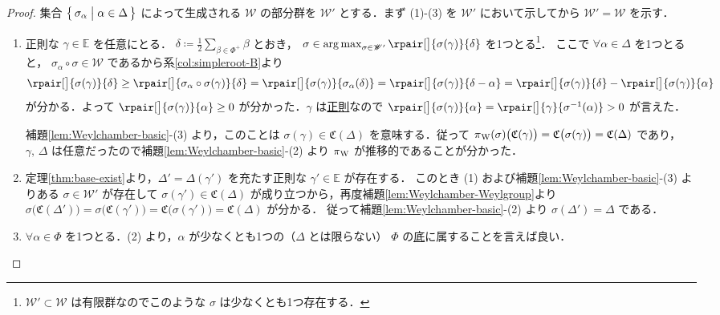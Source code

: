 \documentclass[rep_main]{subfiles}
\begin{document}
\begin{proof}
	集合 $\bigl\{\, \sigma_\alpha \bigm| \alpha \in \Delta \,\bigr\}$ によって生成される $\mathscr{W}$ の部分群を $\mathscr{W}'$ とする．まず (1)-(3) を $\mathscr{W}'$ において示してから $\mathscr{W}' = \mathscr{W}$ を示す．
	\begin{enumerate}
		\item 正則な $\gamma \in \mathbb{E}$ を任意にとる．
		$\delta \coloneqq \frac{1}{2} \sum_{\beta \in \Phi^+} \beta$ とおき，
		$\sigma \in \argmax_{\sigma \in \mathscr{W}'} \rpair[\big]{\sigma(\gamma)}{\delta}$
		を1つとる\footnote{$\mathscr{W}' \subset \mathscr{W}$ は有限群なのでこのような $\sigma$ は少なくとも1つ存在する．}．
		ここで $\forall \alpha \in \Delta$ を1つとると， 
		$\sigma_\alpha \circ \sigma \in \mathscr{W}$ であるから系\ref{col:simpleroot-B}より
		\begin{align}
			\rpair[\big]{\sigma(\gamma)}{\delta} \ge \rpair[\big]{\sigma_\alpha\circ \sigma(\gamma)}{\delta} = \rpair[\big]{\sigma(\gamma)}{\sigma_\alpha(\delta)} = \rpair[\big]{\sigma(\gamma)}{\delta - \alpha} = \rpair[\big]{\sigma(\gamma)}{\delta} - \rpair[\big]{\sigma(\gamma)}{\alpha}
		\end{align}
		が分かる．よって $\rpair[\big]{\sigma(\gamma)}{\alpha} \ge 0$ が分かった．$\gamma$ は\hyperref[def:decomposable]{正則}なので $\rpair[\big]{\sigma(\gamma)}{\alpha} = \rpair[\big]{\gamma}{\sigma^{-1}(\alpha)} > 0$ が言えた．
		
		補題\ref{lem:Weylchamber-basic}-(3) より，このことは $\sigma(\gamma) \in \mathfrak{C}(\Delta)$ を意味する．従って $\pi{}_{\mathrm{W}}(\sigma) \bigl( \mathfrak{C}(\gamma) \bigr) = \mathfrak{C}\bigl(\sigma(\gamma)\bigr) = \mathfrak{C}(\Delta)$ であり，$\gamma,\, \Delta$ は任意だったので補題\ref{lem:Weylchamber-basic}-(2) より $\pi{}_{\mathrm{W}}$ が推移的であることが分かった．

		\item 定理\ref{thm:base-exist}より，$\Delta' = \Delta(\gamma')$ を充たす正則な $\gamma' \in \mathbb{E}$ が存在する．
		このとき (1) および補題\ref{lem:Weylchamber-basic}-(3) よりある $\sigma \in \mathscr{W}'$ が存在して $\sigma (\gamma') \in \mathfrak{C}(\Delta)$ が成り立つから，再度補題\ref{lem:Weylchamber-Weylgroup}より $\sigma \bigl( \mathfrak{C}(\Delta') \bigr) = \sigma \bigl(\mathfrak{C}(\gamma')\bigr) = \mathfrak{C} \bigl( \sigma(\gamma') \bigr) = \mathfrak{C}(\Delta)$ が分かる．
		従って補題\ref{lem:Weylchamber-basic}-(2) より $\sigma(\Delta') = \Delta$ である．
		\item $\forall \alpha \in \Phi$ を1つとる．(2) より，$\alpha$ が少なくとも1つの（$\Delta$ とは限らない） $\Phi$ の\hyperref[def:base-root]{底}に属することを言えば良い．
		

\end{enumerate}
\end{proof}
\end{document}
